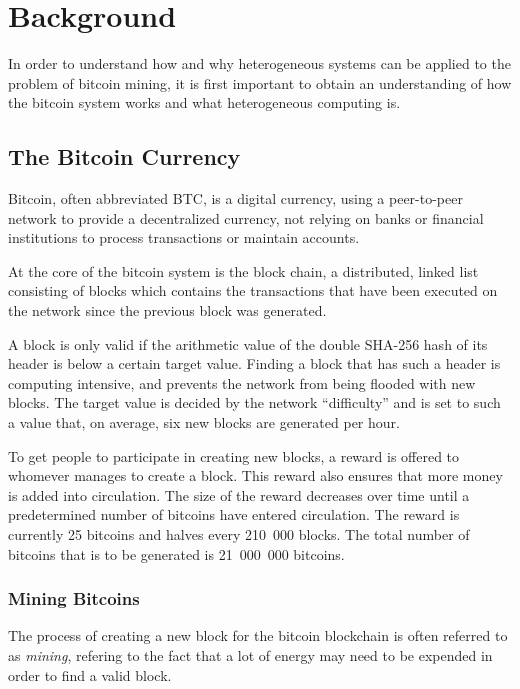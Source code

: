\chapter{Background}
\label{cha:background}

In order to understand how and why heterogeneous systems can be applied to the problem of
bitcoin mining, it is first important to obtain an understanding of how the bitcoin system
works and what heterogeneous computing is.

\section{The Bitcoin Currency}
\label{sec:bitcoins}

Bitcoin, often abbreviated BTC, is a digital currency, using a peer-to-peer network to provide
a decentralized currency, not relying on banks or financial institutions to process transactions
or maintain accounts.

At the core of the bitcoin system is the block chain, a distributed, linked list consisting of blocks
which contains the transactions that have been executed on the network since the previous block was
generated.

A block is only valid if the arithmetic value of the double SHA-256 hash of its header is below
a certain target value. Finding a block that has such a header is computing intensive, and prevents
the network from being flooded with new blocks. The target value is decided by the network ``difficulty''
and is set to such a value that, on average, six new blocks are generated per hour.

To get people to participate in creating new blocks, a reward is offered to whomever manages to
create a block. This reward also ensures that more money is added into circulation. The size of
the reward decreases over time until a predetermined number of bitcoins have entered circulation.
The reward is currently 25 bitcoins and halves every 210~000 blocks. The total number of bitcoins
that is to be generated is 21~000~000 bitcoins. \cite{bitcoin}

\subsection{Mining Bitcoins}
\label{sec:bitcoin-mining}

The process of creating a new block for the bitcoin blockchain is often referred to as \textit{mining},
refering to the fact that a lot of energy may need to be expended in order to find a valid block.

